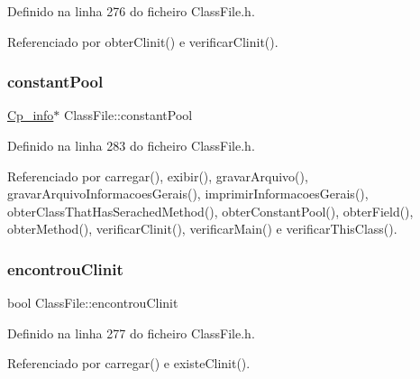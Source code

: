Definido na linha 276 do ficheiro Class\+File.\+h.



Referenciado por obter\+Clinit() e verificar\+Clinit().

\mbox{\label{classClassFile_a5883215e48e253a84c105a18d34049ca}} 
\subsubsection{\texorpdfstring{constant\+Pool}{constantPool}}
{\footnotesize\ttfamily \hyperlink{structCp__info}{Cp\+\_\+info}$\ast$ Class\+File\+::constant\+Pool\hspace{0.3cm}{\ttfamily [private]}}



Definido na linha 283 do ficheiro Class\+File.\+h.



Referenciado por carregar(), exibir(), gravar\+Arquivo(), gravar\+Arquivo\+Informacoes\+Gerais(), imprimir\+Informacoes\+Gerais(), obter\+Class\+That\+Has\+Serached\+Method(), obter\+Constant\+Pool(), obter\+Field(), obter\+Method(), verificar\+Clinit(), verificar\+Main() e verificar\+This\+Class().

\mbox{\label{classClassFile_a5c60c8d51584f48f22bdbdd719960e05}} 
\subsubsection{\texorpdfstring{encontrou\+Clinit}{encontrouClinit}}
{\footnotesize\ttfamily bool Class\+File\+::encontrou\+Clinit\hspace{0.3cm}{\ttfamily [private]}}



Definido na linha 277 do ficheiro Class\+File.\+h.



Referenciado por carregar() e existe\+Clinit().

\mbox{\label{classClassFile_ad8d08e096c470901c62d1a9e31a202bf}} 
